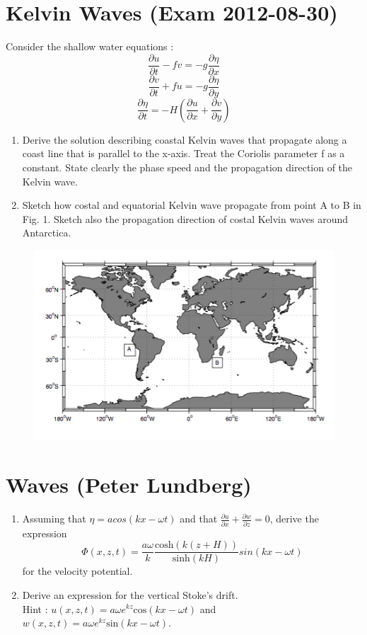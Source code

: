 \documentclass[a4paper,11pt]{article}
\begin{document}
\section{Kelvin Waves (Exam 2012-08-30)}
Consider the shallow water equations :
\begin{equation}
\frac{\partial u}{\partial t}-fv = -g\frac{\partial \eta}{\partial x}
\end{equation}
\begin{equation}
\frac{\partial v}{\partial t}+fu = -g\frac{\partial \eta}{\partial y}
\end{equation}
\begin{equation}
\frac{\partial \eta}{\partial t} = -H\left(\frac{\partial u}{\partial x} + \frac{\partial v}{\partial y}\right)
\end{equation}
\begin{enumerate}
\item Derive the solution describing coastal Kelvin waves that propagate along a coast line that is parallel to the x-axis. Treat the Coriolis parameter f as a constant. State clearly the phase speed and the propagation direction of the Kelvin wave.
\item Sketch how costal and equatorial Kelvin wave propagate from point A to B in Fig. 1. Sketch also the propagation direction of costal Kelvin waves around Antarctica.
\end{enumerate}
\begin{figure}[t]
\center
\includegraphics[width=30pc,angle=0]{Fig1}
\caption{}
\end{figure}

\section{Waves (Peter Lundberg)} 
\begin{enumerate}
\item Assuming that $\eta = acos(kx - \omega t)$ and that $\frac{\partial u}{\partial x} + \frac{\partial w}{\partial z}  = 0$, derive the expression
$$
\Phi(x, z, t) = \frac{a\omega}{k} \frac{\text{cosh}(k(z + H))}{\text{sinh}(kH)} sin(kx - \omega t)
$$
for the velocity potential.
\item Derive an expression for the vertical Stoke's drift.\\
Hint : $u(x,z,t) = a\omega e^{kz} \text{cos}(kx - \omega t)$ and $w(x,z,t) = a\omega e^{kz} \text{sin}(kx - \omega t)$.
\end{enumerate}
\end{document}
